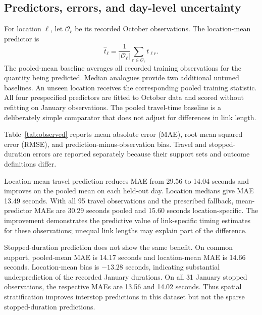 \documentclass[11pt]{article}
\theoremstyle{remark}\newtheorem{remark}[theorem]{Remark}
\begin{document}
\subsection{Predictors, errors, and day-level uncertainty}
For location $\ell$, let $\mathcal O_\ell$ be its recorded October observations. The location-mean predictor is
\begin{equation}
\widehat t_\ell=\frac{1}{|\mathcal O_\ell|}\sum_{r\in\mathcal O_\ell}t_{\ell r}.
\end{equation}
The pooled-mean baseline averages all recorded training observations for the quantity being predicted. Median analogues provide two additional untuned baselines. An unseen location receives the corresponding pooled training statistic. All four prespecified predictors are fitted to October data and scored without refitting on January observations. The pooled travel-time baseline is a deliberately simple comparator that does not adjust for differences in link length.

Table~\ref{tab:observed} reports mean absolute error (MAE), root mean squared error (RMSE), and prediction-minus-observation bias. Travel and stopped-duration errors are reported separately because their support sets and outcome definitions differ.
\begin{table}[htbp]\centering\small
\caption{Chronological prediction errors on January 7--11, 2019 observations with October training support. Travel includes 90 link observations; stopped duration includes 29 numeric observations. Bias is prediction minus observation. All values are in seconds per observation.}\label{tab:observed}

\end{table}

Location-mean travel prediction reduces MAE from 29.56 to 14.04 seconds and improves on the pooled mean on each held-out day. Location medians give MAE 13.49 seconds. With all 95 travel observations and the prescribed fallback, mean-predictor MAEs are 30.29 seconds pooled and 15.60 seconds location-specific. The improvement demonstrates the predictive value of link-specific timing estimates for these observations; unequal link lengths may explain part of the difference.

Stopped-duration prediction does not show the same benefit. On common support, pooled-mean MAE is 14.17 seconds and location-mean MAE is 14.66 seconds. Location-mean bias is $-13.28$ seconds, indicating substantial underprediction of the recorded January durations. On all 31 January stopped observations, the respective MAEs are 13.56 and 14.02 seconds. Thus spatial stratification improves interstop predictions in this dataset but not the sparse stopped-duration predictions.
\end{document}

